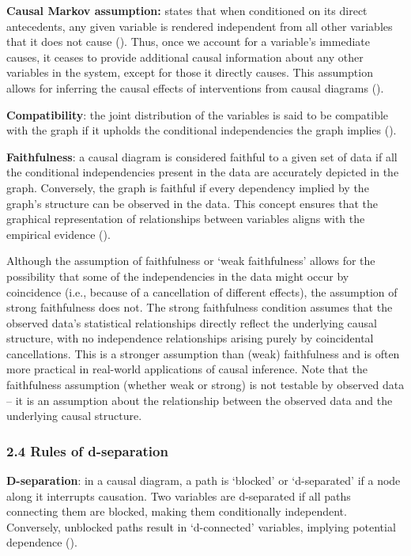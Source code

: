 \documentclass[
  singlecolumn]{article}
\begin{document}
\textbf{Causal Markov assumption:} states that when conditioned on its
direct antecedents, any given variable is rendered independent from all
other variables that it does not cause (). Thus, once we account for a variable's immediate
causes, it ceases to provide additional causal information about any
other variables in the system, except for those it directly causes. This
assumption allows for inferring the causal effects of interventions from
causal diagrams ().

\textbf{Compatibility}: the joint distribution of the variables is said
to be compatible with the graph if it upholds the conditional
independencies the graph implies ().

\textbf{Faithfulness}: a causal diagram is considered faithful to a
given set of data if all the conditional independencies present in the
data are accurately depicted in the graph. Conversely, the graph is
faithful if every dependency implied by the graph's structure can be
observed in the data. This concept ensures that the graphical
representation of relationships between variables aligns with the
empirical evidence ().

Although the assumption of faithfulness or `weak faithfulness' allows
for the possibility that some of the independencies in the data might
occur by coincidence (i.e., because of a cancellation of different
effects), the assumption of strong faithfulness does not. The strong
faithfulness condition assumes that the observed data's statistical
relationships directly reflect the underlying causal structure, with no
independence relationships arising purely by coincidental cancellations.
This is a stronger assumption than (weak) faithfulness and is often more
practical in real-world applications of causal inference. Note that the
faithfulness assumption (whether weak or strong) is not testable by
observed data -- it is an assumption about the relationship between the
observed data and the underlying causal structure.

\subsubsection{2.4 Rules of d-separation}\label{rules-of-d-separation}

\textbf{D-separation}: in a causal diagram, a path is `blocked' or
`d-separated' if a node along it interrupts causation. Two variables are
d-separated if all paths connecting them are blocked, making them
conditionally independent. Conversely, unblocked paths result in
`d-connected' variables, implying potential dependence
().
\end{document}
